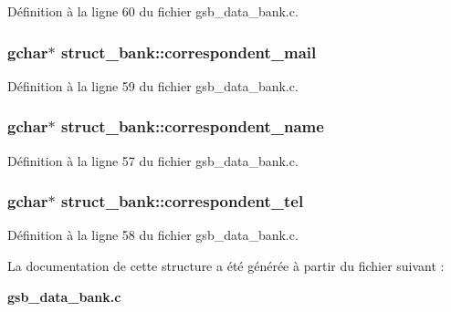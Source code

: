 Définition à la ligne 60 du fichier gsb\_\-data\_\-bank.c.

\subsubsection[{correspondent\_\-mail}]{\setlength{\rightskip}{0pt plus 5cm}gchar$\ast$ {\bf struct\_\-bank::correspondent\_\-mail}}\label{structstruct__bank_a0bb4c571d2ab514c7a260e432521adaf}


Définition à la ligne 59 du fichier gsb\_\-data\_\-bank.c.

\subsubsection[{correspondent\_\-name}]{\setlength{\rightskip}{0pt plus 5cm}gchar$\ast$ {\bf struct\_\-bank::correspondent\_\-name}}\label{structstruct__bank_a8dd705a2face35b2f81fdadb99938c5f}


Définition à la ligne 57 du fichier gsb\_\-data\_\-bank.c.

\subsubsection[{correspondent\_\-tel}]{\setlength{\rightskip}{0pt plus 5cm}gchar$\ast$ {\bf struct\_\-bank::correspondent\_\-tel}}\label{structstruct__bank_afb0c2c643e0533df62fc6c61e8a078f9}


Définition à la ligne 58 du fichier gsb\_\-data\_\-bank.c.



La documentation de cette structure a été générée à partir du fichier suivant :\begin{DoxyCompactItemize}
\item 
{\bf gsb\_\-data\_\-bank.c}\end{DoxyCompactItemize}
